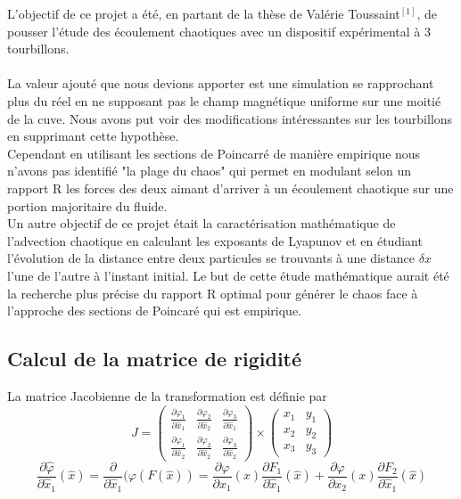 \documentclass[a4paper,12pt,titlepage]{report}
\begin{document}
\begin{onehalfspace}
L'objectif de ce projet a été, en partant de la thèse de Valérie Toussaint$^{[1]}$, de pousser l'étude des écoulement chaotiques avec un dispositif expérimental à 3 tourbillons. \\
\\
La valeur ajouté que nous devions apporter est une simulation se rapprochant plus du réel en ne supposant pas le champ magnétique uniforme sur une moitié de la cuve. Nous avons put voir des modifications intéressantes sur les  tourbillons en supprimant cette hypothèse.\\
Cependant en utilisant les sections de Poincarré de manière empirique nous n'avons pas identifié "la plage du chaos" qui permet en modulant selon un rapport R les forces des deux aimant d'arriver à un écoulement chaotique sur une portion majoritaire du fluide. \\
Un autre objectif de ce projet était la caractérisation mathématique de l'advection chaotique en calculant les exposants de Lyapunov et en étudiant l'évolution de la distance entre deux particules se trouvants à une distance $\delta x$ l'une de l'autre à l'instant initial. Le but de cette étude mathématique aurait été la recherche plus précise du rapport R optimal pour générer le chaos face à l'approche des sections de Poincaré qui est empirique.

\begin{appendix}

\chapter{Calcul de la matrice de rigidité}
\label{annexe_1}

La matrice Jacobienne de la transformation est définie par
\[	
J =
\begin{pmatrix}
  \frac{\partial\varphi_{1}}{\partial \hat{x}_{1}} & \frac{\partial\varphi_{2}}{\partial \hat{x}_{2}}  & \frac{\partial\varphi_{3}}{\partial \hat{x}_{1}}\\ 
  \frac{\partial\varphi_{1}}{\partial \hat{x}_{2}} & \frac{\partial \varphi_{2}}{\partial \hat{x}_{2}} & \frac{\partial\varphi_{3}}{\partial \hat{x}_{2}} 
\end{pmatrix} 
\times
\begin{pmatrix}
   x_{1} &  y_{1} \\
   x_{2} &  y_{2} \\
   x_{3} &  y_{3}
\end{pmatrix}
\]
\[
\frac{\partial \hat{\varphi}}{\partial \hat{x}_{1}}(\hat{x}) = 
\frac{\partial}{\partial \hat{x}_{1}}(\varphi(F(\hat{x})) = 
\frac{\partial \varphi}{\partial x_{1}}(x) \frac{\partial F_{1}}{\partial \hat{x}_{1}}(\hat{x}) +
\frac{\partial \varphi}{\partial x_{2}}(x) \frac{\partial F_{2}}{\partial \hat{x}_{1}}(\hat{x})
\]


\end{appendix}
\end{onehalfspace}
\end{document}
